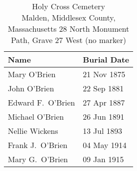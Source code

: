 \begin{table}[ht]
	\centering
	\caption{Holy Cross Cemetery\cite{HolyCrossPlotMichael} \\
		Malden, Middlesex County, Massachusetts
		28 North Monument Path, Grave 27 West (no marker)}
	\begin{tabular}{|l|l|}
		\hline
		\textbf{Name} & \textbf{Burial Date} \\
		\hline
		Mary O'Brien\index{O'Brien!Mary\textsuperscript{3} (1875--1875)} & 21 Nov 1875 \\
		\hline
		John O'Brien\index{O'Brien!John Joseph\textsuperscript{3} (1876--1881)} & 22 Sep 1881 \\
		\hline
		Edward F.\ O'Brien\index{O'Brien!Edward William\textsuperscript{4} (1884--1887)} & 27 Apr 1887 \\
		\hline
		Michael O'Brien\index{O'Brien!Michael\textsuperscript{2}} & 26 Jun 1891 \\
		\hline
		Nellie Wickens\index{Wickens!Nellie\textsuperscript{4}} & 13 Jul 1893 \\
		\hline
		Frank J.\ O'Brien\index{O'Brien!Francis Joseph\textsuperscript{3}} & 04 May 1914 \\
		\hline
		Mary G.\ O'Brien\index{Field!Mary}\index{O'Brien!Mary (Field)} & 09 Jan 1915 \\
		\hline
	\end{tabular}
\end{table}

